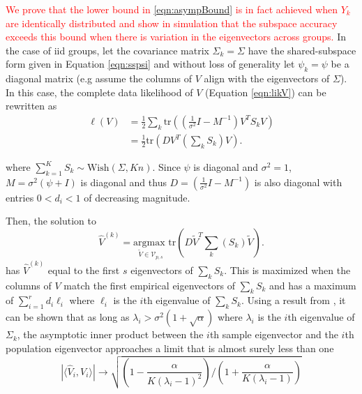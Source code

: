\documentclass{statsoc}
\newcommand{\tr}{\text{tr}}
\newcommand{\edits}[1]{{\textsf{\textcolor{red}{#1}}}}
\begin{document}
\edits{%
  We prove that the lower bound in \ref{eqn:asympBound} is
in fact achieved when $Y_k$ are identically distributed and show in simulation
that the subspace accuracy exceeds this bound when there is variation
in the eigenvectors across groups. }
In the case of iid groups, let the covariance matrix $\Sigma_k=\Sigma$ have the shared-subspace form given in
Equation \ref{eqn:sspsi} and without loss of
generality let $\psi_k = \psi$ be a diagonal matrix (e.g assume
the columns of $V$ align with the eigenvectors of $\Sigma$).  In this
case, the complete data likelihood of $V$ (Equation
\ref{eqn:likV}) can be rewritten as
%
\begin{align*}
\ell(V) &=\frac{1}{2}\sum_k \tr\left((\frac{1}{\sigma^2}I-M^{-1})V^T
  S_kV\right)\\
&=\frac{1}{2}\tr\left(DV^T(\sum_k S_k)V\right).
\end{align*}
%

\noindent where $\sum_{k=1}^K S_k \sim \text{Wish}(\Sigma, Kn)$.
Since $\psi$ is diagonal and $\sigma^2=1$, 
$M = \sigma^2(\psi + I)$ is diagonal and thus
$D = (\frac{1}{\sigma^2}I-M^{-1})$ is also diagonal with entries
$0 < d_i < 1$ of decreasing magnitude.  

Then, the solution to
$$\hat{V}^{(k)} = \underset{\widetilde{V} \in \mathcal{V}_{p,
    s}}{\text{argmax }} \tr\left(D\widetilde{V}^T
 \sum_k( S_k)\widetilde{V}\right).$$
has $\hat{V}^{(k)}$ equal to the first $s$ eigenvectors of $\sum_k S_k$.  This is
maximized when the columns of $V$ match the first empirical eigenvectors of
$\sum_k S_k$ and has a maximum of $\sum_{i=1}^r d_i\ell_i$ where $\ell_i$ is the
$i$th eigenvalue of $\sum_k S_k$.  Using a result from
\citet{Paul2007}, it can be shown that as long as
$\lambda_i > \sigma^2(1 + \sqrt{\alpha})$ where $\lambda_i$ is the $i$th
eigenvalue of $\Sigma_k$, the asymptotic inner product between
the $i$th sample eigenvector and the $i$th population eigenvector
approaches a limit that is almost surely less than one
$$|\langle\hat{V}_i, V_i\rangle| \to \sqrt{\left(1-\frac{\alpha}{K(\lambda_i - 1)^2}\right) /\left(1 +
    \frac{\alpha}{K(\lambda_i - 1)}\right)} $$
%
\end{document}
